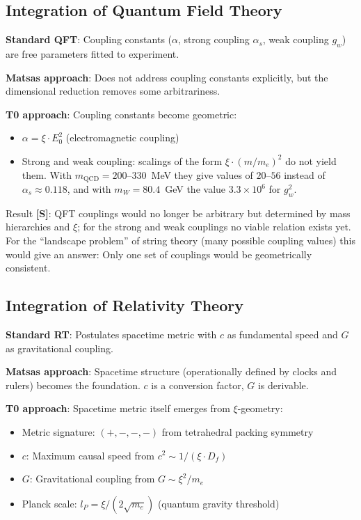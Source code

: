 	\subsection{Integration of Quantum Field Theory}
	
	\textbf{Standard QFT}: Coupling constants ($\alpha$, strong coupling $\alpha_s$, weak coupling $g_w$) are free parameters fitted to experiment.
	
	\textbf{Matsas approach}: Does not address coupling constants explicitly, but the dimensional reduction removes some arbitrariness.
	
	\textbf{T0 approach}: Coupling constants become geometric:
	\begin{itemize}
		\item $\alpha = \xi \cdot E_0^2$ (electromagnetic coupling)
		\item Strong and weak coupling: scalings of the form $\xi \cdot (m/m_e)^2$ do not yield them. With $m_{\text{QCD}} = 200$--$330$~MeV they give values of $20$--$56$ instead of $\alpha_s \approx 0.118$, and with $m_W = 80.4$~GeV the value $3.3 \times 10^{6}$ for $g_w^2$.
	\end{itemize}
	
	Result \textbf{[S]}: QFT couplings would no longer be arbitrary but determined by mass hierarchies and $\xi$; for the strong and weak couplings no viable relation exists yet. For the ``landscape problem'' of string theory (many possible coupling values) this would give an answer: Only one set of couplings would be geometrically consistent.
	
	\subsection{Integration of Relativity Theory}
	
	\textbf{Standard RT}: Postulates spacetime metric with $c$ as fundamental speed and $G$ as gravitational coupling.
	
	\textbf{Matsas approach}: Spacetime structure (operationally defined by clocks and rulers) becomes the foundation. $c$ is a conversion factor, $G$ is derivable.
	
	\textbf{T0 approach}: Spacetime metric itself emerges from $\xi$-geometry:
	\begin{itemize}
		\item Metric signature: $(+,-,-,-)$ from tetrahedral packing symmetry
		\item $c$: Maximum causal speed from $c^2 \sim 1/(\xi \cdot D_f)$
		\item $G$: Gravitational coupling from $G \sim \xi^2 / m_e$
		\item Planck scale: $l_P = \xi/(2\sqrt{m_e})$ (quantum gravity threshold)
	\end{itemize}
	
